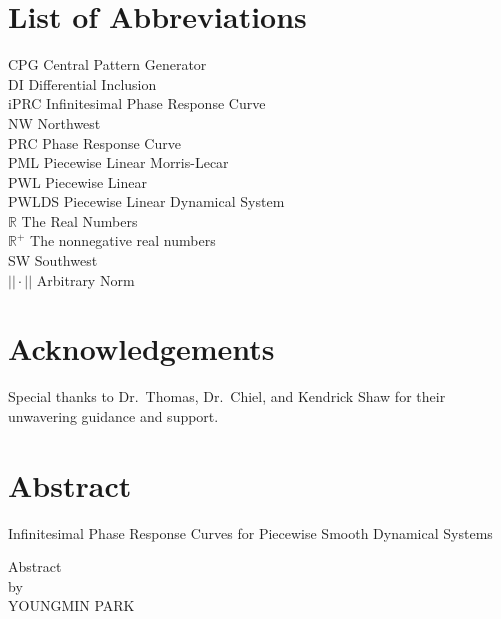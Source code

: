 \documentclass[12pt]{article}
\begin{document}
\section*{List of Abbreviations}
CPG Central Pattern Generator\\
DI Differential Inclusion\\
iPRC Infinitesimal Phase Response Curve\\
NW Northwest\\
PRC Phase Response Curve\\
PML Piecewise Linear Morris-Lecar\\
PWL Piecewise Linear\\
PWLDS Piecewise Linear Dynamical System\\
$\mathbb{R}$ The Real Numbers\\
$\mathbb{R}^+$ The nonnegative real numbers\\
SW Southwest\\
$||\cdot||$ Arbitrary Norm\\
\newpage

\section*{Acknowledgements}
Special thanks to Dr.~Thomas, Dr.~Chiel, and Kendrick Shaw for their unwavering guidance and support.  
\newpage




\section*{Abstract}
\begin{center}
 Infinitesimal Phase Response Curves for Piecewise Smooth Dynamical Systems\\
 \vspace{.5in}
 
 Abstract\\
 
 by\\
 
 YOUNGMIN PARK
\end{center}
\end{document}
